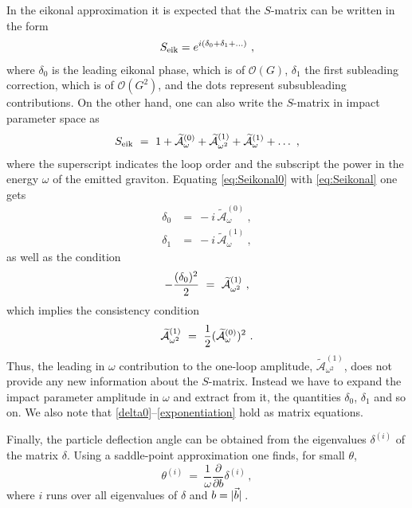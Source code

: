 \documentclass[a4paper,11pt]{article}
\numberwithin{equation}{section}
\newcommand{\cA}{\mathcal{A}}
\def\cA{\mathcal{A}}
\begin{document}
In the eikonal approximation it is expected that the $S$-matrix can be written in the form \cite{Amati:1990xe}
\begin{align}
\label{eq:Seikonal0}
S_{\rm eik} = 
e^{i (\delta_0+ \delta_1+ \ldots ) }
\ , 
\end{align} 
where $\delta_0$ is the leading eikonal phase, which is of $\mathcal{O}(G)$, $\delta_1$ the first subleading correction, which is of $\mathcal{O}(G^2)$,  and the dots represent  subsubleading contributions. On the other hand, one can also write the $S$-matrix in impact parameter space as
\begin{align}
\label{eq:Seikonal}
S_{\rm eik} \ = \ 1 +  \widetilde{\cA}^{(0)}_{\omega} +  \widetilde{\cA}^{(1)}_{\omega^2} + \widetilde{\cA}^{(1)}_{\omega} + \ldots \ , 
\end{align}
 where the superscript indicates the loop order and the subscript the power in the energy $\omega$ of the emitted graviton. 
Equating \eqref{eq:Seikonal0} with \eqref{eq:Seikonal} one gets
\begin{align} 
\label{delta0}
\delta_0 &= \  -i \, \widetilde{\cA}^{(0)}_{\omega}\ ,\\[.2em]
\label{delta1}
\delta_1 &= \  -i\,  \widetilde{\cA}^{(1)}_{\omega}\ , 
\end{align}
as well as the condition 
\begin{align} 
- {(\delta_0)^2\over 2} \ = \  \widetilde{\cA}^{(1)}_{\omega^2}
\ , 
\end{align}
which implies the consistency condition 
\begin{align}
\label{exponentiation}
\widetilde{\cA}^{(1)}_{\omega^2} \ = \   {1\over 2} (\widetilde{\cA}^{(0)}_{\omega})^2
 \ . 
 \end{align}
Thus, the  leading in $\omega$ contribution to the one-loop amplitude, $\widetilde{\cA}^{(1)}_{\omega^2}$,  does  not provide any new information about the $S$-matrix.  Instead we have to expand the impact parameter amplitude in $\omega$ and extract from it, the quantities   $\delta_0$, $\delta_1$ and so on. We also note that \eqref{delta0}--\eqref{exponentiation} hold as  matrix equations. 



Finally, the particle deflection angle can  be obtained from the eigenvalues $\delta^{(i)}$ of the matrix $\delta$. 
Using a saddle-point approximation \cite{Amati:1990xe, Bjerrum-Bohr:2016hpa,Bjerrum-Bohr:2017dxw} one finds, for small $\theta$, 
\begin{equation}
\label{rebend}
\theta^{(i)}  \ = \ \frac{1}{\omega} \frac{\partial}{\partial b} {\delta^{(i)}} \, , 
\end{equation}
where  $i$ runs over all  eigenvalues of $\delta$ and $b=\abs*{\vec{b}}$. 
\end{document}
